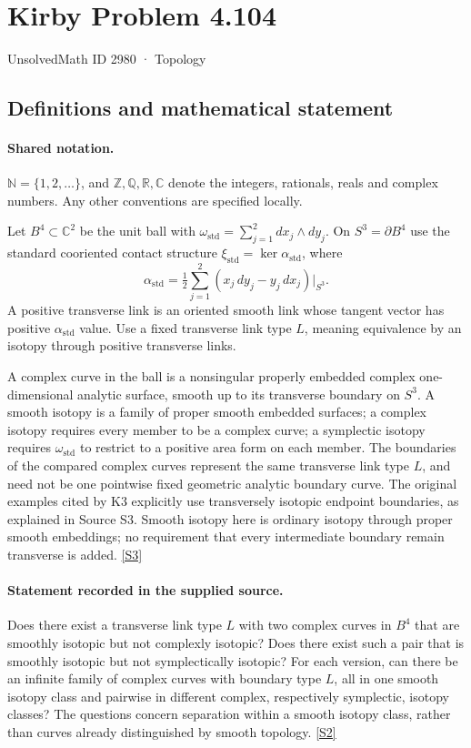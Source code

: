 \documentclass[11pt]{article}
\newcommand{\sref}[2]{\hyperlink{source:#1:#2}{[S#2]}}
\begin{document}
\setcounter{section}{2979}
\section{Kirby Problem 4.104}\label{2980}
{\small\sffamily UnsolvedMath ID 2980 · Topology}
\subsection{Definitions and mathematical statement}

\paragraph{Shared notation.}$\mathbb N=\{1,2,\ldots\}$, and $\mathbb Z,\mathbb Q,\mathbb R,\mathbb C$ denote the integers, rationals, reals and complex numbers. Any other conventions are specified locally.


Let $B^4\subset\mathbb C^2$ be the unit ball with $\omega_{\mathrm{std}}=\sum_{j=1}^2dx_j\wedge dy_j$. On $S^3=\partial B^4$ use the standard cooriented contact structure $\xi_{\mathrm{std}}=\ker\alpha_{\mathrm{std}}$, where
\[
\alpha_{\mathrm{std}}=\tfrac12\sum_{j=1}^2(x_j\,dy_j-y_j\,dx_j)\big|_{S^3}.
\]
A positive transverse link is an oriented smooth link whose tangent vector has positive $\alpha_{\mathrm{std}}$ value. Use a fixed transverse link type $L$, meaning equivalence by an isotopy through positive transverse links.

A complex curve in the ball is a nonsingular properly embedded complex one-dimensional analytic surface, smooth up to its transverse boundary on $S^3$. A smooth isotopy is a family of proper smooth embedded surfaces; a complex isotopy requires every member to be a complex curve; a symplectic isotopy requires $\omega_{\mathrm{std}}$ to restrict to a positive area form on each member. The boundaries of the compared complex curves represent the same transverse link type $L$, and need not be one pointwise fixed geometric analytic boundary curve. The original examples cited by K3 explicitly use transversely isotopic endpoint boundaries, as explained in Source S3. Smooth isotopy here is ordinary isotopy through proper smooth embeddings; no requirement that every intermediate boundary remain transverse is added. \sref{2980}{3}
\paragraph{Statement recorded in the supplied source.}
Does there exist a transverse link type $L$ with two complex curves in $B^4$ that are smoothly isotopic but not complexly isotopic? Does there exist such a pair that is smoothly isotopic but not symplectically isotopic? For each version, can there be an infinite family of complex curves with boundary type $L$, all in one smooth isotopy class and pairwise in different complex, respectively symplectic, isotopy classes? The questions concern separation within a smooth isotopy class, rather than curves already distinguished by smooth topology. \sref{2980}{2}
\end{document}
